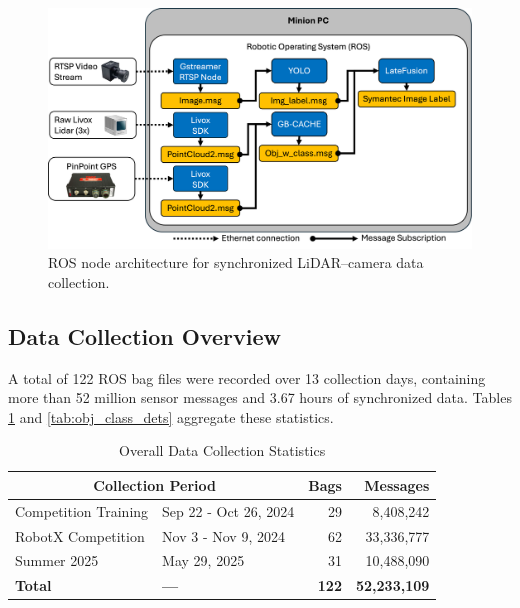 \documentclass{erauthesis}
\begin{document}

\begin{figure}[htbp]
    \centering
    \includegraphics[width=0.95\linewidth]{Images/ros.png}
    \caption{ROS node architecture for synchronized LiDAR–camera data collection.}
    \label{fig:ros}
\end{figure}



\subsection{Data Collection Overview}
\label{sec:data_overview}

A total of 122 ROS bag files were recorded over 13 collection days,  containing more than 52 million sensor messages and 3.67 hours of synchronized data.  
Tables \ref{tab:rosbag_stats} and \ref{tab:obj_class_dets} aggregate these statistics.  

\begin{table}[h]
\centering
\begin{tabular}{llrr}
\hline
\multicolumn{2}{c}{Collection Period} & Bags & Messages \\
\hline
\hline
Competition Training & Sep 22 - Oct 26, 2024 & 29 & 8,408,242 \\
RobotX Competition & Nov 3 - Nov 9, 2024 & 62 & 33,336,777 \\
Summer 2025  & May 29, 2025 & 31 & 10,488,090 \\
\hline
\textbf{Total} & \textbf{---} & \textbf{122} & \textbf{52,233,109} \\
\hline
\end{tabular}
\caption{Overall Data Collection Statistics}
\label{tab:rosbag_stats}
\end{table}
\end{document}
